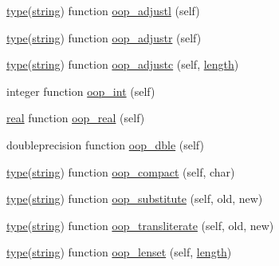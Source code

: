 \begin{DoxyCompactItemize}
\item 
\hyperlink{stop__watch_83_8txt_a70f0ead91c32e25323c03265aa302c1c}{type}(\hyperlink{structm__strings__oop_1_1string}{string}) function \hyperlink{namespacem__strings__oop_a8e2457b4a1c4489e9600e340fa9ce533}{oop\+\_\+adjustl} (self)
\item 
\hyperlink{stop__watch_83_8txt_a70f0ead91c32e25323c03265aa302c1c}{type}(\hyperlink{structm__strings__oop_1_1string}{string}) function \hyperlink{namespacem__strings__oop_abb0dfa5646259e4fc768700eada111ac}{oop\+\_\+adjustr} (self)
\item 
\hyperlink{stop__watch_83_8txt_a70f0ead91c32e25323c03265aa302c1c}{type}(\hyperlink{structm__strings__oop_1_1string}{string}) function \hyperlink{namespacem__strings__oop_a9fa932c23648e737230553a8e7bfb15b}{oop\+\_\+adjustc} (self, \hyperlink{M__stopwatch_83_8txt_a04ed5ef37abacfa36a856b5f30376485}{length})
\item 
integer function \hyperlink{namespacem__strings__oop_a2092266bec4014f74b8d436c5a8e319f}{oop\+\_\+int} (self)
\item 
\hyperlink{read__watch_83_8txt_abdb62bde002f38ef75f810d3a905a823}{real} function \hyperlink{namespacem__strings__oop_a9709a714bc825704651b00c7384a7547}{oop\+\_\+real} (self)
\item 
doubleprecision function \hyperlink{namespacem__strings__oop_aa6eaf2b8a12a905d0ebaa21a84871dec}{oop\+\_\+dble} (self)
\item 
\hyperlink{stop__watch_83_8txt_a70f0ead91c32e25323c03265aa302c1c}{type}(\hyperlink{structm__strings__oop_1_1string}{string}) function \hyperlink{namespacem__strings__oop_ac02aecbaebcf57833b544de4f50c89a6}{oop\+\_\+compact} (self, char)
\item 
\hyperlink{stop__watch_83_8txt_a70f0ead91c32e25323c03265aa302c1c}{type}(\hyperlink{structm__strings__oop_1_1string}{string}) function \hyperlink{namespacem__strings__oop_af653c84bbd0165d1d4a3b61efe0472e8}{oop\+\_\+substitute} (self, old, new)
\item 
\hyperlink{stop__watch_83_8txt_a70f0ead91c32e25323c03265aa302c1c}{type}(\hyperlink{structm__strings__oop_1_1string}{string}) function \hyperlink{namespacem__strings__oop_ac88f27671dd1129023494bf2500ca7fd}{oop\+\_\+transliterate} (self, old, new)
\item 
\hyperlink{stop__watch_83_8txt_a70f0ead91c32e25323c03265aa302c1c}{type}(\hyperlink{structm__strings__oop_1_1string}{string}) function \hyperlink{namespacem__strings__oop_ac8ca18186659b8759b08e5167a3effb5}{oop\+\_\+lenset} (self, \hyperlink{M__stopwatch_83_8txt_a04ed5ef37abacfa36a856b5f30376485}{length})

\end{DoxyCompactItemize}

